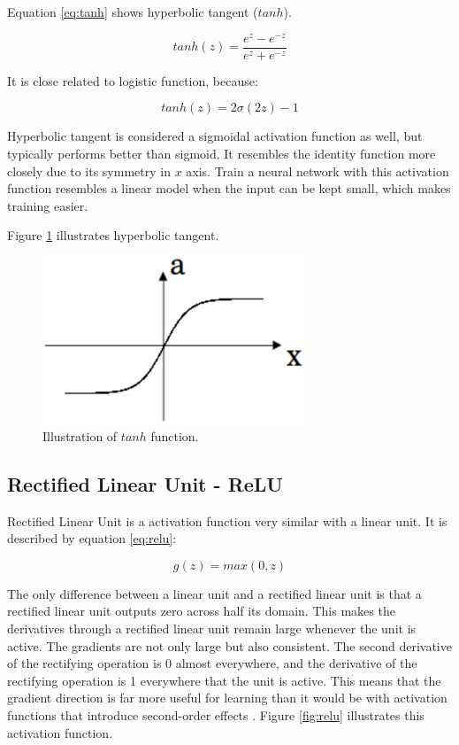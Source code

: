 Equation \ref{eq:tanh} shows hyperbolic tangent ($tanh$).


\begin{equation}
tanh(z) = \frac{e^{z} - e^{-z}}{e^{z} + e^{-z}}
\label{eq:tanh}
\end{equation}

It is close related to logistic function, because:

\begin{equation}
tanh(z) = 2\sigma(2z) - 1
\label{eq:tanhsigmoid}
\end{equation}

Hyperbolic tangent is considered a sigmoidal activation function as well, but typically performs better than sigmoid. It resembles the identity function more closely due to its symmetry in $x$ axis. Train a neural network with this activation function resembles a linear model when the input can be kept small, which makes training easier.

Figure \ref{fig:tanh} illustrates hyperbolic tangent.

\begin{figure}[!htbp]
	\centering
	\includegraphics[width=0.7\textwidth]{Cap3/tanh.eps}
	\caption{Illustration of $tanh$ function.}
	\label{fig:tanh}
\end{figure}


\subsection{Rectified Linear Unit - ReLU}

Rectified Linear Unit is a activation function very similar with a linear unit. It is described by equation \ref{eq:relu}:

\begin{equation}
g(z) = max(0,z)
\label{eq:relu}
\end{equation}

The only difference between a linear unit and a rectified linear unit is
that a rectified linear unit outputs zero across half its domain. This makes the
derivatives through a rectified linear unit remain large whenever the unit is active.
The gradients are not only large but also consistent. The second derivative of the
rectifying operation is 0 almost everywhere, and the derivative of the rectifying
operation is 1 everywhere that the unit is active. This means that the gradient
direction is far more useful for learning than it would be with activation functions
that introduce second-order effects \cite{Goodfellow-et-al-2016}. Figure \ref{fig:relu} illustrates this activation function.


